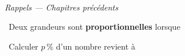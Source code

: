 \documentclass[a4paper,11pt]{article}
\newcommand{\coeurrappel}{\textcolor{Couleur6}{\faHeart}\ }
\begin{document}
\vspace{0.3cm}
\noindent{\textcolor{Couleur8}{\rule{\textwidth}{0.5pt}}}\\
{\small\textit{\textcolor{Couleur8}{Rappels --- Chapitres pr\'ec\'edents}}}
\vspace{0.1cm}

\noindent \coeurrappel Deux grandeurs sont \textbf{proportionnelles} lorsque \dotfill

\noindent \coeurrappel Calculer $p$\,\% d'un nombre revient \`a \dotfill
\end{document}
